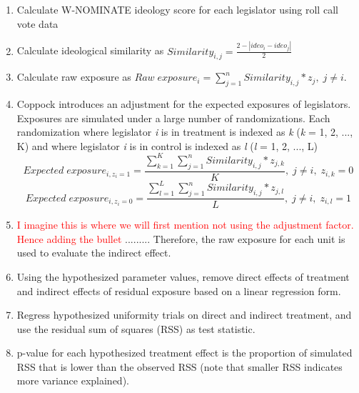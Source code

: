 \documentclass[12pt]{article}
\begin{document}
\begin{enumerate}
\item Calculate W-NOMINATE ideology score for each legislator using roll call vote data

\item Calculate ideological similarity as $Similarity_{i,j} = \frac{2 - |ideo_i - ideo_j|}{2}$

\item Calculate raw exposure as $Raw\; exposure_i =  \sum_{j=1}^{n}Similarity_{i,j} * z_j, \; j \neq i$. 

\item Coppock introduces an adjustment for the expected exposures of legislators. Exposures are simulated under a large number of randomizations. Each randomization where legislator \textit{i} is in treatment is indexed as \textit{k} (\textit{k} = 1, 2, ..., K) and where legislator \textit{i} is in control is indexed as \textit{l} (\textit{l} = 1, 2, ..., L) $$Expected \; exposure_{i, z_i=1} =  \frac{\sum_{k=1}^{K}\sum_{j=1}^{n}Similarity_{i,j} * z_{j,k}}{K}, \; j \neq i, \; z_{i,k}=0$$ $$Expected \; exposure_{i, z_i=0} =  \frac{\sum_{l=1}^{L}\sum_{j=1}^{n}Similarity_{i,j} * z_{j,l}}{L}, \; j \neq i, \; z_{i,l}=1$$

\item \textcolor{red}{I imagine this is where we will first mention not using the adjustment factor. Hence adding the bullet} ......... Therefore, the raw exposure for each unit is used to evaluate the indirect effect.

\item Using the hypothesized parameter values, remove direct effects of treatment and indirect effects of residual exposure based on a linear regression form.

\item Regress hypothesized uniformity trials on direct and indirect treatment, and use the residual sum of squares (RSS) as test statistic.

\item p-value for each hypothesized treatment effect is the proportion of simulated RSS that is lower than the observed RSS (note that smaller RSS indicates more variance explained).
\end{enumerate}


\subsection{\citet{bergan2015call}}
\end{document}
